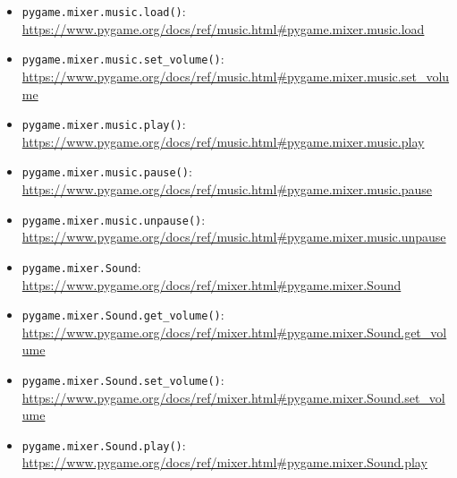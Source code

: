 \begin{itemize}
\item \texttt{pygame.mixer.music.load()}:
\\ \url{https://www.pygame.org/docs/ref/music.html#pygame.mixer.music.load}

	\item \texttt{pygame.mixer.music.set\_volume()}:
\\ \url{https://www.pygame.org/docs/ref/music.html#pygame.mixer.music.set_volume}

	\item \texttt{pygame.mixer.music.play()}:
\\ \url{https://www.pygame.org/docs/ref/music.html#pygame.mixer.music.play}

	\item \texttt{pygame.mixer.music.pause()}:
\\ \url{https://www.pygame.org/docs/ref/music.html#pygame.mixer.music.pause}

	\item \texttt{pygame.mixer.music.unpause()}:
\\ \url{https://www.pygame.org/docs/ref/music.html#pygame.mixer.music.unpause}


	\item \texttt{pygame.mixer.Sound}:
\\ \url{https://www.pygame.org/docs/ref/mixer.html#pygame.mixer.Sound}

	\item \texttt{pygame.mixer.Sound.get\_volume()}:
\\ \url{https://www.pygame.org/docs/ref/mixer.html#pygame.mixer.Sound.get_volume}

	\item \texttt{pygame.mixer.Sound.set\_volume()}:
\\ \url{https://www.pygame.org/docs/ref/mixer.html#pygame.mixer.Sound.set_volume}

	\item \texttt{pygame.mixer.Sound.play()}:
\\ \url{https://www.pygame.org/docs/ref/mixer.html#pygame.mixer.Sound.play}

\end{itemize}


